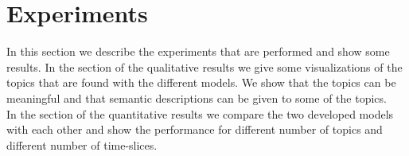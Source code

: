 \documentclass[11pt,a4paper]{article}
\begin{document}
% 
% 
% 
% 
% 
% 



\pagebreak

\section{Experiments}
\label{sec:Experiments}
In this section we describe the experiments that are performed and show some results. In the section of the qualitative results we give some visualizations of the topics that are found with the different models. We show that the topics can be meaningful and that semantic descriptions can be given to some of the topics.\\
In the section of the quantitative results we compare the two developed models with each other and show the performance for different number of topics and different number of time-slices.
\end{document}
